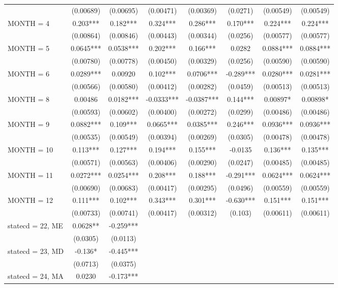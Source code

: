 \begin{tabular}{lccccccc}
 & (0.00689) & (0.00695) & (0.00471) & (0.00369) & (0.0271) & (0.00549) & (0.00549) \\
MONTH = 4 & 0.203*** & 0.182*** & 0.324*** & 0.286*** & 0.170*** & 0.224*** & 0.224*** \\
 & (0.00864) & (0.00846) & (0.00443) & (0.00344) & (0.0256) & (0.00577) & (0.00577) \\
MONTH = 5 & 0.0645*** & 0.0538*** & 0.202*** & 0.166*** & 0.0282 & 0.0884*** & 0.0884*** \\
 & (0.00780) & (0.00778) & (0.00450) & (0.00329) & (0.0256) & (0.00590) & (0.00590) \\
MONTH = 6 & 0.0289*** & 0.00920 & 0.102*** & 0.0706*** & -0.289*** & 0.0280*** & 0.0281*** \\
 & (0.00566) & (0.00580) & (0.00412) & (0.00282) & (0.0459) & (0.00513) & (0.00513) \\
MONTH = 8 & 0.00486 & 0.0182*** & -0.0333*** & -0.0387*** & 0.144*** & 0.00897* & 0.00898* \\
 & (0.00593) & (0.00602) & (0.00400) & (0.00272) & (0.0299) & (0.00486) & (0.00486) \\
MONTH = 9 & 0.0882*** & 0.109*** & 0.0665*** & 0.0385*** & 0.246*** & 0.0936*** & 0.0936*** \\
 & (0.00535) & (0.00549) & (0.00394) & (0.00269) & (0.0305) & (0.00478) & (0.00478) \\
MONTH = 10 & 0.113*** & 0.127*** & 0.194*** & 0.155*** & -0.0135 & 0.136*** & 0.135*** \\
 & (0.00571) & (0.00563) & (0.00406) & (0.00290) & (0.0247) & (0.00485) & (0.00485) \\
MONTH = 11 & 0.0272*** & 0.0254*** & 0.208*** & 0.188*** & -0.291*** & 0.0624*** & 0.0624*** \\
 & (0.00690) & (0.00683) & (0.00417) & (0.00295) & (0.0496) & (0.00559) & (0.00559) \\
MONTH = 12 & 0.111*** & 0.102*** & 0.343*** & 0.301*** & -0.630*** & 0.151*** & 0.151*** \\
 & (0.00733) & (0.00741) & (0.00417) & (0.00312) & (0.103) & (0.00611) & (0.00611) \\
statecd = 22, ME & 0.0628** & -0.259*** &  &  &  &  &  \\
 & (0.0305) & (0.0113) &  &  &  &  &  \\
statecd = 23, MD & -0.136* & -0.445*** &  &  &  &  &  \\
 & (0.0713) & (0.0375) &  &  &  &  &  \\
statecd = 24, MA & 0.0230 & -0.173*** &  &  &  &  &  \\

\end{tabular}
